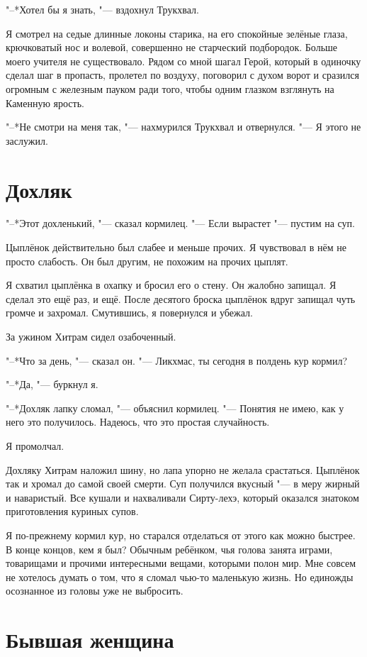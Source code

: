 \documentclass[a4paper,10pt,fleqn]{book}
\begin{document}
"--*Хотел бы я знать, "--- вздохнул Трукхвал.

Я смотрел на седые длинные локоны старика, на его спокойные зелёные глаза, крючковатый нос и волевой, совершенно не старческий подбородок.
Больше моего учителя не существовало.
Рядом со мной шагал Герой, который в одиночку сделал шаг в пропасть, пролетел по воздуху, поговорил с духом ворот и сразился огромным с железным пауком ради того, чтобы одним глазком взглянуть на Каменную ярость.

"--*Не смотри на меня так, "--- нахмурился Трукхвал и отвернулся.
"--- Я этого не заслужил.

\section{Дохляк}

"--*Этот дохленький, "--- сказал кормилец.
"--- Если вырастет "--- пустим на суп.

Цыплёнок действительно был слабее и меньше прочих.
Я чувствовал в нём не просто слабость.
Он был другим, не похожим на прочих цыплят.

Я схватил цыплёнка в охапку и бросил его о стену.
Он жалобно запищал.
Я сделал это ещё раз, и ещё.
После десятого броска цыплёнок вдруг запищал чуть громче и захромал.
Смутившись, я повернулся и убежал.

За ужином Хитрам сидел озабоченный.

"--*Что за день, "--- сказал он.
"--- Ликхмас, ты сегодня в полдень кур кормил?

"--*Да, "--- буркнул я.

"--*Дохляк лапку сломал, "--- объяснил кормилец.
"--- Понятия не имею, как у него это получилось.
Надеюсь, что это простая случайность.

Я промолчал.

Дохляку Хитрам наложил шину, но лапа упорно не желала срастаться.
Цыплёнок так и хромал до самой своей смерти.
Суп получился вкусный "--- в меру жирный и наваристый.
Все кушали и нахваливали Сирту-лехэ, который оказался знатоком приготовления куриных супов.

Я по-прежнему кормил кур, но старался отделаться от этого как можно быстрее.
В конце концов, кем я был?
Обычным ребёнком, чья голова занята играми, товарищами и прочими интересными вещами, которыми полон мир.
Мне совсем не хотелось думать о том, что я сломал чью-то маленькую жизнь.
Но единожды осознанное из головы уже не выбросить.

\section{Бывшая женщина}
\end{document}

